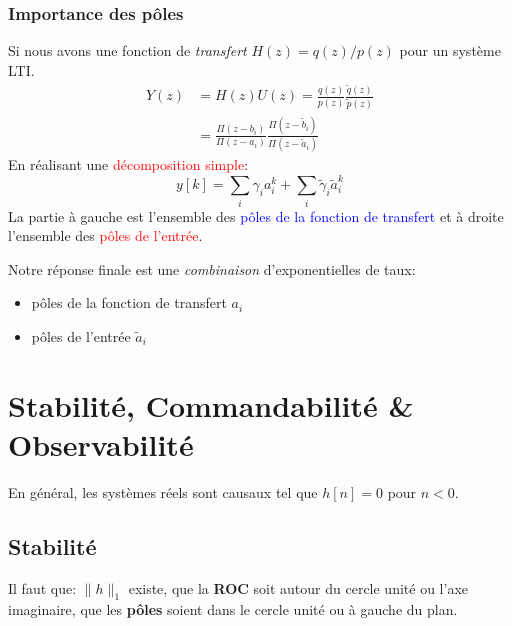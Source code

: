 \documentclass{report}
\begin{document}
\subsection{Importance des pôles}
Si nous avons une fonction de \textit{transfert} $H(z) = q(z)/p(z)$ pour un système LTI.
\begin{align*}
Y(z) &= H(z) U(z) = \frac{q(z)}{p(z)} \frac{\tilde{q}(z)}{\tilde{p}(z)}\\
&= \frac{\Pi (z-b_i)}{\Pi (z-a_i)} \frac{\Pi (z- \tilde{b}_i)}{\Pi (z - \tilde{a}_i)}
\end{align*}
En réalisant une \textcolor{red}{décomposition simple}:
\begin{equation}
y[k] = \sum_i \gamma_i a_i^k + \sum_i \tilde{\gamma}_i \tilde{a}_i^k
\end{equation}
La partie à gauche est l'ensemble des \textcolor{blue}{pôles de la fonction de transfert} et à droite l'ensemble des \textcolor{red}{pôles de l'entrée}.\par
Notre réponse finale est une \textit{combinaison} d'exponentielles de taux:
\begin{itemize}
\item pôles de la fonction de transfert $a_i$
\item pôles de l'entrée $\tilde{a}_i$
\end{itemize}



\chapter{Stabilité, Commandabilité \& Observabilité}

En général, les systèmes réels sont causaux tel que $h[n] = 0$ pour $n<0$.
\section{Stabilité}
Il faut que: $\parallel h \parallel_1$ existe, que la \textbf{ROC} soit autour du cercle unité ou l'axe imaginaire, que les \textbf{pôles} soient dans le cercle unité ou à gauche du plan.
\end{document}
